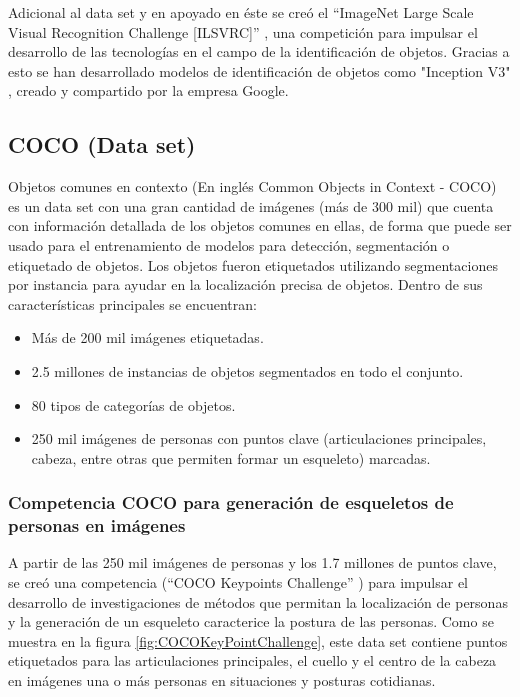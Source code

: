         Adicional al data set y en apoyado en éste se creó el ``ImageNet Large Scale Visual Recognition Challenge [ILSVRC]'' \cite{Imagenet-ILSVRC15}, una competición para impulsar el desarrollo de las tecnologías en el campo de la identificación de objetos. Gracias a esto se han desarrollado modelos de identificación de objetos como "Inception V3" \cite{InceptionV32016}, creado y compartido por la empresa Google.
        
    \subsection{COCO (Data set)}
    \label{sub:FrameCOCO}
    
        Objetos comunes en contexto (En inglés Common Objects in Context - COCO) es un data set con una gran cantidad de imágenes (más de 300 mil) \cite{COCO2014} que cuenta con información detallada de los objetos comunes en ellas, de forma que puede ser usado para el entrenamiento de modelos para detección, segmentación o etiquetado de objetos. Los objetos fueron etiquetados utilizando segmentaciones por instancia para ayudar en la localización precisa de objetos. Dentro de sus características principales se encuentran:
        
        \begin{itemize}
            \item Más de 200 mil imágenes etiquetadas.
            \item 2.5 millones de instancias de objetos segmentados en todo el conjunto.
            \item 80 tipos de categorías de objetos.
            \item 250 mil imágenes de personas con puntos clave (articulaciones principales, cabeza, entre otras que permiten formar un esqueleto) marcadas.
        \end{itemize}
        
        \subsubsection{Competencia COCO para generación de esqueletos de personas en imágenes}
        \label{sub2:FrameCOCOKeyPoints}
        
            A partir de las 250 mil imágenes de personas y los 1.7 millones de puntos clave, se creó una competencia (``COCO Keypoints        Challenge'' \cite{Coco2020KeyPointsHome}) para impulsar el desarrollo de investigaciones de métodos que permitan la localización de personas y la generación de un esqueleto caracterice la postura de las personas. Como se muestra en la figura \ref{fig:COCOKeyPointChallenge}, este data set contiene puntos etiquetados para las articulaciones principales, el cuello y el centro de la cabeza en imágenes una o más personas en situaciones y posturas cotidianas.
        
